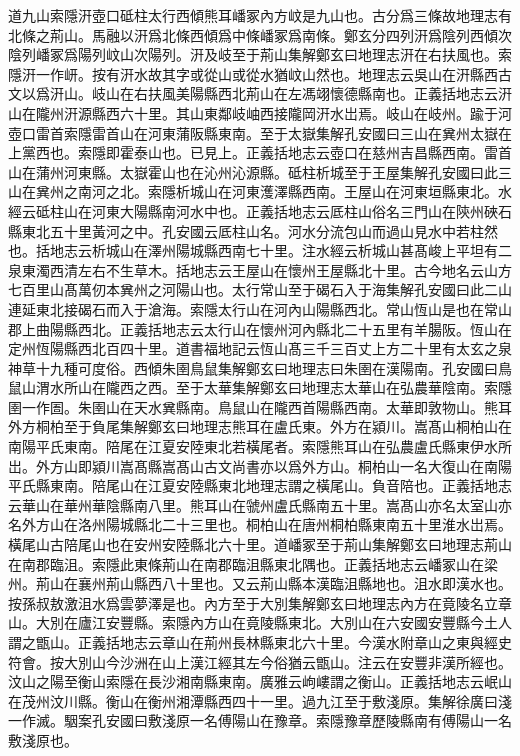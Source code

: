 道九山索隱汧壺口砥柱太行西傾熊耳嶓冢內方㞶是九山也。古分爲三條故地理志有北條之荊山。馬融以汧爲北條西傾爲中條嶓冢爲南條。鄭玄分四列汧爲陰列西傾次陰列嶓冢爲陽列㞶山次陽列。汧及岐至于荊山集解鄭玄曰地理志汧在右扶風也。索隱汧一作岍。按有汧水故其字或從山或從水猶㞶山然也。地理志云吳山在汧縣西古文以爲汧山。岐山在右扶風美陽縣西北荊山在左馮翊懷德縣南也。正義括地志云汧山在隴州汧源縣西六十里。其山東鄰岐岫西接隴岡汧水岀焉。岐山在岐州。踰于河壺口雷首索隱雷首山在河東蒲阪縣東南。至于太嶽集解孔安國曰三山在兾州太嶽在上黨西也。索隱即霍泰山也。已見上。正義括地志云壺口在慈州吉昌縣西南。雷首山在蒲州河東縣。太嶽霍山也在沁州沁源縣。砥柱析城至于王屋集解孔安國曰此三山在兾州之南河之北。索隱析城山在河東濩澤縣西南。王屋山在河東垣縣東北。水經云砥柱山在河東大陽縣南河水中也。正義括地志云厎柱山俗名三門山在陝州硤石縣東北五十里黃河之中。孔安國云厎柱山名。河水分流包山而過山見水中若柱然也。括地志云析城山在澤州陽城縣西南七十里。注水經云析城山甚髙峻上平坦有二泉東濁西清左右不生草木。括地志云王屋山在懷州王屋縣北十里。古今地名云山方七百里山髙萬仞本兾州之河陽山也。太行常山至于碣石入于海集解孔安國曰此二山連延東北接碣石而入于滄海。索隱太行山在河內山陽縣西北。常山恆山是也在常山郡上曲陽縣西北。正義括地志云太行山在懷州河內縣北二十五里有羊腸阪。恆山在定州恆陽縣西北百四十里。道書福地記云恆山髙三千三百丈上方二十里有太玄之泉神草十九種可度俗。西傾朱圉鳥鼠集解鄭玄曰地理志曰朱圉在漢陽南。孔安國曰鳥鼠山渭水所山在隴西之西。至于太華集解鄭玄曰地理志太華山在弘農華陰南。索隱圉一作圄。朱圉山在天水兾縣南。鳥鼠山在隴西首陽縣西南。太華即敦物山。熊耳外方桐柏至于負尾集解鄭玄曰地理志熊耳在盧氏東。外方在潁川。嵩髙山桐柏山在南陽平氏東南。陪尾在江夏安陸東北若橫尾者。索隱熊耳山在弘農盧氏縣東伊水所岀。外方山即潁川嵩髙縣嵩髙山古文尚書亦以爲外方山。桐柏山一名大復山在南陽平氏縣東南。陪尾山在江夏安陸縣東北地理志謂之橫尾山。負音陪也。正義括地志云華山在華州華陰縣南八里。熊耳山在虢州盧氏縣南五十里。嵩髙山亦名太室山亦名外方山在洛州陽城縣北二十三里也。桐柏山在唐州桐柏縣東南五十里淮水岀焉。橫尾山古陪尾山也在安州安陸縣北六十里。道嶓冢至于荊山集解鄭玄曰地理志荊山在南郡臨沮。索隱此東條荊山在南郡臨沮縣東北隅也。正義括地志云嶓冢山在梁州。荊山在襄州荊山縣西八十里也。又云荊山縣本漢臨沮縣地也。沮水即漢水也。按孫叔敖激沮水爲雲夢澤是也。內方至于大別集解鄭玄曰地理志內方在竟陵名立章山。大別在廬江安豐縣。索隱內方山在竟陵縣東北。大別山在六安國安豐縣今土人謂之甑山。正義括地志云章山在荊州長林縣東北六十里。今漢水附章山之東與經史符會。按大別山今沙洲在山上漢江經其左今俗猶云甑山。注云在安豐非漢所經也。汶山之陽至衡山索隱在長沙湘南縣東南。廣雅云岣嶁謂之衡山。正義括地志云岷山在茂州汶川縣。衡山在衡州湘潭縣西四十一里。過九江至于敷淺原。集解徐廣曰淺一作滅。駰案孔安國曰敷淺原一名傅陽山在豫章。索隱豫章歷陵縣南有傅陽山一名敷淺原也。

